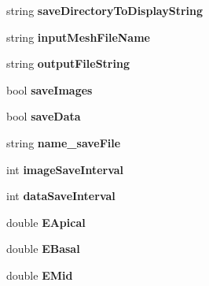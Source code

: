 \begin{DoxyCompactItemize}
\item 
\hypertarget{classSimulation_abdcb4d27d207276b9e594f15eeda8770}{}string {\bfseries save\+Directory\+To\+Display\+String}\label{classSimulation_abdcb4d27d207276b9e594f15eeda8770}

\item 
\hypertarget{classSimulation_adffbb38b93e49d3e04cb084f613f00be}{}string {\bfseries input\+Mesh\+File\+Name}\label{classSimulation_adffbb38b93e49d3e04cb084f613f00be}

\item 
\hypertarget{classSimulation_aef8d41ae6883aef6f6e960821ec47ab2}{}string {\bfseries output\+File\+String}\label{classSimulation_aef8d41ae6883aef6f6e960821ec47ab2}

\item 
\hypertarget{classSimulation_afb8b3f2ba1e2d02eec79d83cbd6b4d16}{}bool {\bfseries save\+Images}\label{classSimulation_afb8b3f2ba1e2d02eec79d83cbd6b4d16}

\item 
\hypertarget{classSimulation_a7d0d5e335aeaefff71fee46ee73d0cba}{}bool {\bfseries save\+Data}\label{classSimulation_a7d0d5e335aeaefff71fee46ee73d0cba}

\item 
\hypertarget{classSimulation_a91fab73b2510cc8d6b9743caa36a990d}{}string {\bfseries name\+\_\+save\+File}\label{classSimulation_a91fab73b2510cc8d6b9743caa36a990d}

\item 
\hypertarget{classSimulation_acc8ebf021a21da302f6aabb24a9c5d87}{}int {\bfseries image\+Save\+Interval}\label{classSimulation_acc8ebf021a21da302f6aabb24a9c5d87}

\item 
\hypertarget{classSimulation_afa3a518b104d571d442f9752c7e3cf92}{}int {\bfseries data\+Save\+Interval}\label{classSimulation_afa3a518b104d571d442f9752c7e3cf92}

\item 
\hypertarget{classSimulation_a624c8f135227f36c3749fb12b89f6937}{}double {\bfseries E\+Apical}\label{classSimulation_a624c8f135227f36c3749fb12b89f6937}

\item 
\hypertarget{classSimulation_ac36c6cc857bb7cdb84ccf9c17ef5bcba}{}double {\bfseries E\+Basal}\label{classSimulation_ac36c6cc857bb7cdb84ccf9c17ef5bcba}

\item 
\hypertarget{classSimulation_a7241e19c4db7e819dad00bf210e8ca46}{}double {\bfseries E\+Mid}\label{classSimulation_a7241e19c4db7e819dad00bf210e8ca46}


\end{DoxyCompactItemize}
